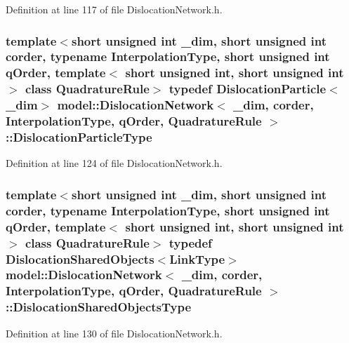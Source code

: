 Definition at line 117 of file Dislocation\+Network.\+h.

\hypertarget{classmodel_1_1_dislocation_network_a9ce7afe017f7dd82bb8e5a992fddc7fd}{}
\subsubsection[{Dislocation\+Particle\+Type}]{\setlength{\rightskip}{0pt plus 5cm}template$<$short unsigned int \+\_\+dim, short unsigned int corder, typename Interpolation\+Type, short unsigned int q\+Order, template$<$ short unsigned int, short unsigned int $>$ class Quadrature\+Rule$>$ typedef {\bf Dislocation\+Particle}$<$\+\_\+dim$>$ {\bf model\+::\+Dislocation\+Network}$<$ \+\_\+dim, corder, Interpolation\+Type, q\+Order, Quadrature\+Rule $>$\+::{\bf Dislocation\+Particle\+Type}}\label{classmodel_1_1_dislocation_network_a9ce7afe017f7dd82bb8e5a992fddc7fd}


Definition at line 124 of file Dislocation\+Network.\+h.

\hypertarget{classmodel_1_1_dislocation_network_a5f6775646c83fb5964cd18bf6d5f3200}{}
\subsubsection[{Dislocation\+Shared\+Objects\+Type}]{\setlength{\rightskip}{0pt plus 5cm}template$<$short unsigned int \+\_\+dim, short unsigned int corder, typename Interpolation\+Type, short unsigned int q\+Order, template$<$ short unsigned int, short unsigned int $>$ class Quadrature\+Rule$>$ typedef {\bf Dislocation\+Shared\+Objects}$<${\bf Link\+Type}$>$ {\bf model\+::\+Dislocation\+Network}$<$ \+\_\+dim, corder, Interpolation\+Type, q\+Order, Quadrature\+Rule $>$\+::{\bf Dislocation\+Shared\+Objects\+Type}}\label{classmodel_1_1_dislocation_network_a5f6775646c83fb5964cd18bf6d5f3200}


Definition at line 130 of file Dislocation\+Network.\+h.

\hypertarget{classmodel_1_1_dislocation_network_aebd83877fb6e1d64a23878d7ec862a59}{}

